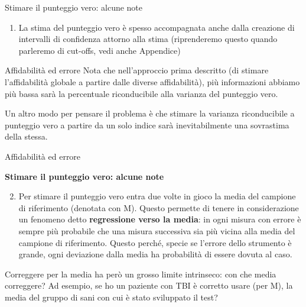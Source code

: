 \documentclass[
  ignorenonframetext,
  aspectratio=169,
]{beamer}
\providecommand{\tightlist}{%
  \setlength{\itemsep}{0pt}\setlength{\parskip}{0pt}}
\begin{document}
\begin{frame}{Stimare il punteggio vero: alcune note}
\label{stimare-il-punteggio-vero-alcune-note}
\begin{enumerate}
[1)]
\tightlist
\item
  La stima del punteggio vero è spesso accompagnata anche dalla
  creazione di intervalli di confidenza attorno alla stima (riprenderemo
  questo quando parleremo di cut-offs, vedi anche Appendice)
\end{enumerate}
\end{frame}

\begin{frame}{Affidabilità ed errore}
\label{affidabilituxe0-ed-errore}
Nota che nell'approccio prima descritto (di stimare l'affidabilità
globale a partire dalle diverse affidabilità), più informazioni abbiamo
più bassa sarà la percentuale riconducibile alla varianza del punteggio
vero.

Un altro modo per pensare il problema è che stimare la varianza
riconducibile a punteggio vero a partire da un solo indice sarà
inevitabilmente una sovrastima della stessa.
\end{frame}

\begin{frame}{Affidabilità ed errore}
\label{affidabilituxe0-ed-errore-1}
\begin{center}
  \textbf{Stimare il punteggio vero: alcune note}
\end{center}

\small

\begin{enumerate}
[1)]
\setcounter{enumi}{1}
\tightlist
\item
  Per stimare il punteggio vero entra due volte in gioco la media del
  campione di riferimento (denotata con M). Questo permette di tenere in
  considerazione un fenomeno detto \textbf{regressione verso la media}:
  in ogni misura con errore è sempre più probabile che una misura
  successiva sia più vicina alla media del campione di riferimento.
  Questo perché, specie se l'errore dello strumento è grande, ogni
  deviazione dalla media ha probabilità di essere dovuta al caso.
\end{enumerate}

Correggere per la media ha però un grosso limite intrinseco: con che
media correggere? Ad esempio, se ho un paziente con TBI è corretto usare
(per M), la media del gruppo di sani con cui è stato sviluppato il test?
\end{frame}
\end{document}
